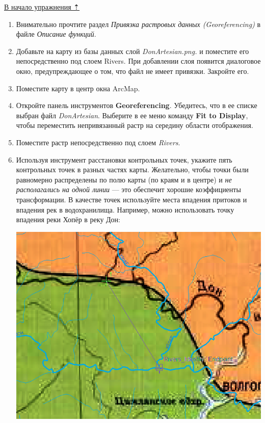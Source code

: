 \documentclass[]{book}
\theoremstyle{definition}
\theoremstyle{definition}
\theoremstyle{definition}
\theoremstyle{remark}
\begin{document}
\protect\hyperlink{map-ref-hydrogeologic}{В начало упражнения ⇡}

\begin{enumerate}
\def\labelenumi{\arabic{enumi}.}
\item
  Внимательно прочтите раздел \emph{Привязка растровых данных
  (Georeferencing)} в файле \emph{Описание функций}.
\item
  Добавьте на карту из базы данных слой \emph{DonArtesian.png.} и
  поместите его непосредственно под слоем Rivers. При добавлении слоя
  появится диалоговое окно, предупреждающее о том, что файл не имеет
  привязки. Закройте его.
\item
  Поместите карту в центр окна ArcMap.
\item
  Откройте панель инструментов \textbf{Georeferencing}. Убедитесь, что в
  ее списке выбран файл \emph{DonArtesian}. Выберите в ее меню команду
  \textbf{Fit to Display}, чтобы переместить непривязанный растр на
  середину области отображения.
\item
  Поместите растр непосредственно под слоем \emph{Rivers}.
\item
  Используя инструмент расстановки контрольных точек, укажите пять
  контрольных точек в разных частях карты. Желательно, чтобы точки были
  равномерно распределены по полю карты (по краям и в центре) и \emph{не
  располагались на одной линии} --- это обеспечит хорошие коэффициенты
  трансформации. В качестве точек используйте места впадения притоков и
  впадения рек в водохранилища. Например, можно использовать точку
  впадения реки Хопёр в реку Дон:

  \includegraphics{images/Ex05/image10.png}


\end{enumerate}
\end{document}
